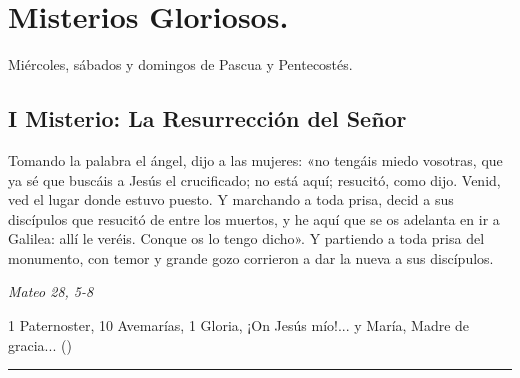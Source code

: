 \documentclass[./rosary.tex]{subfiles}
\begin{document}
\section*{Misterios Gloriosos.}
Miércoles, sábados y domingos de Pascua y Pentecostés.

\subsection*{I Misterio: La Resurrección del Señor}

Tomando la palabra el ángel, dijo a las mujeres: «no tengáis miedo vosotras, que ya sé que buscáis a Jesús el crucificado;
no está aquí; resucitó, como dijo. Venid, ved el lugar donde estuvo puesto. Y marchando a toda prisa,
decid a sus discípulos que resucitó de entre los muertos, y he aquí que se os adelanta en ir a Galilea: allí le veréis.
Conque os lo tengo dicho». Y partiendo a toda prisa del monumento, con temor y grande gozo corrieron a dar la nueva a sus discípulos.

\begin{flushright}
    \emph{Mateo 28, 5-8}
\end{flushright}

1 Paternoster, 10 Avemarías, 1 Gloria, ¡On Jesús mío!... y María, Madre de gracia... ()

\rule{\textwidth}{0.5pt}
\end{document}
